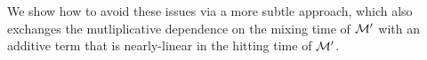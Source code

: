 We show how to avoid these issues via a more subtle approach, which also exchanges the mutliplicative dependence 
on the mixing time of $\cal M'$ with an additive term that is nearly-linear in the hitting time of $\cal M'$.

%
%
